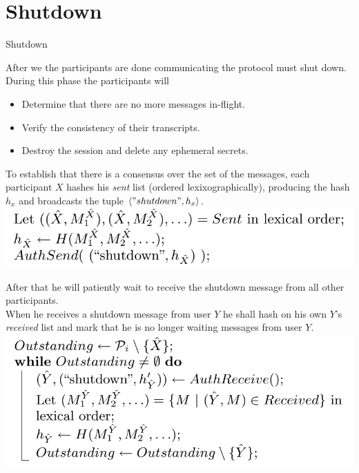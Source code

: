 \section{Shutdown}

\begin{frame}
\Huge{\centerline{Shutdown}}
\end{frame}

\begin{frame}
After we the participants are done communicating the protocol must shut down.
\vfill
During this phase the participants will

  \begin{itemize}
    \item Determine that there are no more messages in-flight.
    \item Verify the consistency of their transcripts.
    \item Destroy the session and delete any ephemeral secrets.
  \end{itemize}
\end{frame}


\begin{frame}
To establish that there is a consensus over the set of the messages, each participant $X$ hashes his \emph{sent} list (ordered lexixographically), producing the hash $h_x$ and broadcasts the tuple $\langle "shutdown", h_x \rangle$.\\[0.5cm]

\includegraphics[scale=0.4]{Figures/sent_hash.png}
\end{frame}

\begin{frame}
After that he will patiently wait to receive the shutdown message from all  other participants.\\[0.5cm]

When he receives a shutdown message from user $Y$ he shall hash on his own $Y$'s \emph{received} list  and mark that he is no longer waiting messages from user $Y$.\\[0.5cm]

\includegraphics[scale=0.4]{Figures/received_hashes.png}
\end{frame}

